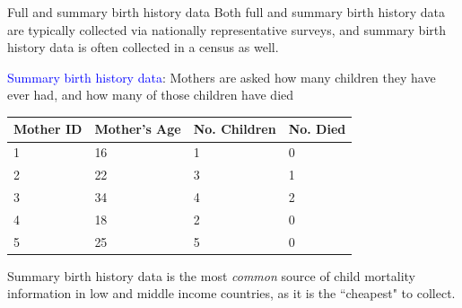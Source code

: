 \documentclass[10pt,t]{beamer}
\begin{document}
\begin{frame}{Full and summary birth history data}
Both full and summary birth history data are typically collected via nationally representative surveys, and summary birth history data is often collected in a census as well.

\vspace{0.3cm}

\textcolor{blue}{Summary birth history data}: Mothers are asked how many children they have ever had, and how many of those children have died

\vspace{0.3cm} \pause

\begin{table}[]
	\begin{tabular}{l|l|l|l}
		\multicolumn{1}{c|}{Mother ID} & \multicolumn{1}{c|}{Mother's Age} & \multicolumn{1}{c|}{No. Children} & \multicolumn{1}{c}{No. Died} \\ \hline
		1                              & 16                                & 1                                 & 0                            \\
		2                              & 22                                & 3                                 & 1                            \\
		3                              & 34                                & 4                                 & 2                            \\
		4                              & 18                                & 2                                 & 0                            \\
		5                              & 25                                & 5                                 & 0                           
	\end{tabular}
\end{table}

\pause Summary birth history data is the most \textit{common} source of child mortality information in low and middle income countries, as it is the ``cheapest" to collect.

\end{frame}
\end{document}
